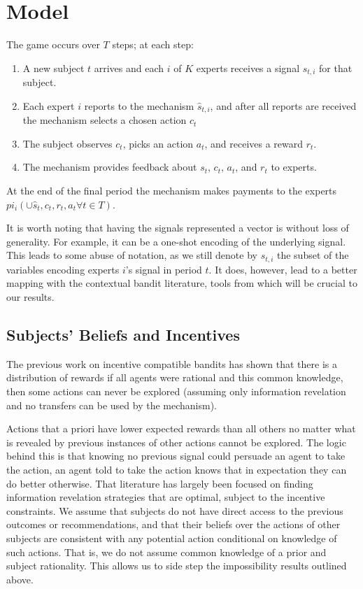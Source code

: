 \section{Model}

The game occurs over $T$ steps; at each step: 

\begin{enumerate}
\item A new subject $t$ arrives and each $i$ of $K$ experts receives a signal $s_{t,i}$ for that subject.
\item Each expert $i$ reports to the mechanism $\hat{s}_{t,i}$, and after all reports are received the mechanism selects a chosen action $c_t$
\item The subject observes $c_t$, picks an action $a_t$, and receives a reward $r_t$.
\item The mechanism provides feedback about $s_t$, $c_t$, $a_t$, and $r_t$ to experts.
\end{enumerate}
At the end of the final period the mechanism makes payments to the experts $pi_i( \cup \hat{s}_t,c_t,r_t,a_t \forall t \in T)$.


It is worth noting that having the signals represented a vector is without loss of generality.
For example, it can be a one-shot encoding of the underlying signal.
This leads to some abuse of notation, as we still denote by $s_{t,i}$ the subset of the variables encoding experts $i$'s signal in period $t$. It does, however, lead to a better mapping with the contextual bandit literature, tools from which will be crucial to our results. 

\subsection{Subjects' Beliefs and Incentives}

The previous work on incentive compatible bandits \cite{kremer2014implementing,mansour2015bayesian} has shown that there is a distribution of rewards if all agents were rational and this common knowledge, then some actions can never be explored (assuming only information revelation and no transfers can be used by the mechanism). 

Actions that a priori have lower expected rewards than all others no matter what is revealed by previous instances of other actions cannot be explored.
The logic behind this is that knowing no previous signal could persuade an agent to take the action, an agent told to take the action knows that in expectation they can do better otherwise.
That literature has largely been focused on finding information revelation strategies that are optimal, subject to the incentive constraints. 
We assume that subjects do not have direct access to the previous outcomes or recommendations, and that their beliefs over the actions of other subjects are consistent with any potential action conditional on knowledge of such actions.
That is, we do not assume common knowledge of a prior and subject rationality.
This allows us to side step the impossibility results outlined above. 

